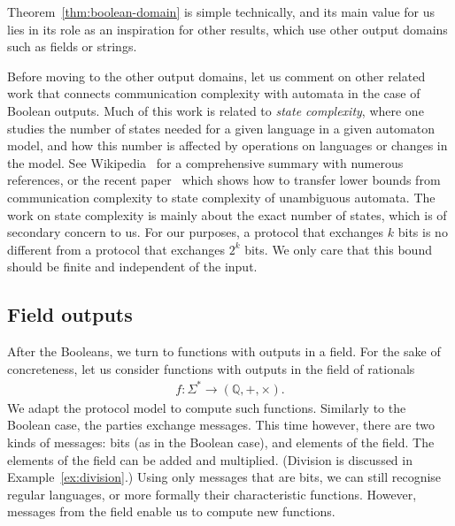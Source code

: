 Theorem~\ref{thm:boolean-domain} is  simple  technically, and its main value for us lies in its role as an inspiration for other results, which use  other output domains  such as  fields or strings. 



Before moving to the other output domains, let us comment on other related work that connects communication complexity with automata in the case of Boolean outputs.  Much of this work is related to \emph{state complexity}, where one studies  the number of states needed for a given language in a given automaton model, and how this number is affected by operations on languages or changes in the model. See  Wikipedia~\cite{stateComplexityWiki} for a comprehensive summary with numerous references, or the recent paper~\cite{goosKiefer2022} which shows how to transfer lower bounds from communication complexity to state complexity of unambiguous automata. 
 The work on state complexity is mainly about the exact number of states, which is of secondary concern to us. For our purposes, a protocol that exchanges $k$ bits is no different from a protocol that exchanges $2^k$ bits. We only care that this bound should be finite and independent of the input. 



\subsection{Field outputs}
\label{sec:intro-field}



After the Booleans, we turn to functions with outputs in a field. For the sake of concreteness, let us  consider functions with outputs in the  field of rationals
\begin{align*}
f : \Sigma^* \to (\mathbb Q, +, \times).
\end{align*}
We adapt the  protocol model to  compute such functions. Similarly to the Boolean case, the parties exchange messages. This time however, there are two kinds of messages: bits (as in the Boolean case), and  elements of the field.  The elements of the field can be added and multiplied.  (Division is discussed in Example~\ref{ex:division}.)  Using only messages that are bits, we can still recognise regular languages, or more formally their characteristic functions. 
However, messages from the field enable us to compute new functions.

